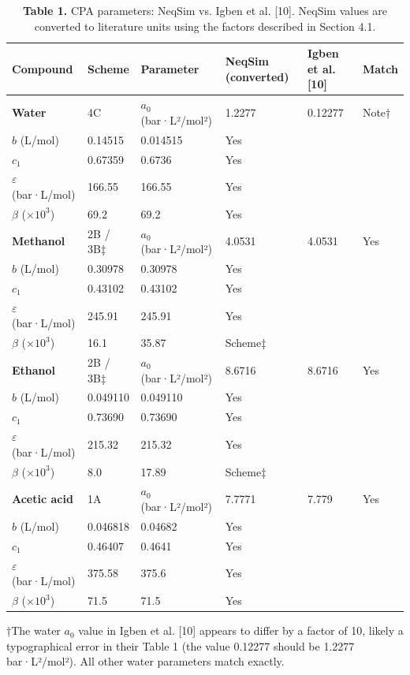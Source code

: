 \documentclass[review,3p]{elsarticle}
\begin{document}
\begin{table}[htbp]
\centering
\caption{\textbf{Table 1.} CPA parameters: NeqSim vs. Igben et al. [10]. NeqSim values are converted to literature units using the factors described in Section 4.1.}
\begin{tabular}{llllll}
\toprule
Compound & Scheme & Parameter & NeqSim (converted) & Igben et al. [10] & Match \\
\midrule
\textbf{Water} & 4C & $a_0$ (bar·L²/mol²) & 1.2277 & 0.12277 & Note† \\
$b$ (L/mol) & 0.14515 & 0.014515 & Yes \\
$c_1$ & 0.67359 & 0.6736 & Yes \\
$\varepsilon$ (bar·L/mol) & 166.55 & 166.55 & Yes \\
$\beta$ ($\times 10^3$) & 69.2 & 69.2 & Yes \\
\textbf{Methanol} & 2B / 3B‡ & $a_0$ (bar·L²/mol²) & 4.0531 & 4.0531 & Yes \\
$b$ (L/mol) & 0.30978 & 0.30978 & Yes \\
$c_1$ & 0.43102 & 0.43102 & Yes \\
$\varepsilon$ (bar·L/mol) & 245.91 & 245.91 & Yes \\
$\beta$ ($\times 10^3$) & 16.1 & 35.87 & Scheme‡ \\
\textbf{Ethanol} & 2B / 3B‡ & $a_0$ (bar·L²/mol²) & 8.6716 & 8.6716 & Yes \\
$b$ (L/mol) & 0.049110 & 0.049110 & Yes \\
$c_1$ & 0.73690 & 0.73690 & Yes \\
$\varepsilon$ (bar·L/mol) & 215.32 & 215.32 & Yes \\
$\beta$ ($\times 10^3$) & 8.0 & 17.89 & Scheme‡ \\
\textbf{Acetic acid} & 1A & $a_0$ (bar·L²/mol²) & 7.7771 & 7.779 & Yes \\
$b$ (L/mol) & 0.046818 & 0.04682 & Yes \\
$c_1$ & 0.46407 & 0.4641 & Yes \\
$\varepsilon$ (bar·L/mol) & 375.58 & 375.6 & Yes \\
$\beta$ ($\times 10^3$) & 71.5 & 71.5 & Yes \\
\bottomrule
\end{tabular}
\end{table}

†The water $a_0$ value in Igben et al. [10] appears to differ by a factor of 10, likely a typographical error in their Table 1 (the value 0.12277 should be 1.2277 bar·L²/mol²). All other water parameters match exactly.
\end{document}
